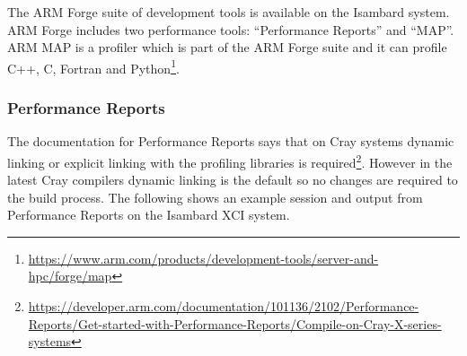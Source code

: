 \documentclass[a4paper,titlepage]{article}
\begin{document}
The ARM Forge suite of development tools is available on the Isambard system. ARM Forge includes two performance tools: ``Performance Reports'' and ``MAP''. 
ARM MAP is a profiler which is part of the ARM Forge suite and it can profile C++, C, Fortran and Python\footnote{\url{https://www.arm.com/products/development-tools/server-and-hpc/forge/map}}.


\subsubsection{Performance Reports}

The documentation for Performance Reports says that on Cray systems dynamic linking or explicit linking with the profiling libraries is required\footnote{\url{https://developer.arm.com/documentation/101136/2102/Performance-Reports/Get-started-with-Performance-Reports/Compile-on-Cray-X-series-systems}}. However in the latest Cray compilers dynamic linking is the default so no changes are required to the build process. The following shows an example session and output from Performance Reports on the Isambard XCI system.
\end{document}
